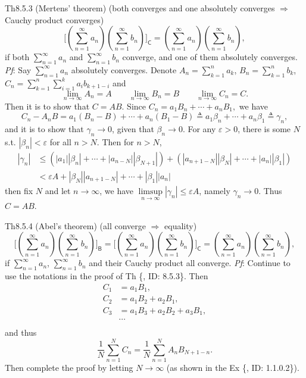 \documentclass{article}
\begin{document}
\begin{Th}{Th8.5.3 (Mertens' theorem) (both converges and one absolutely converges $\Rightarrow$ Cauchy product converges)}
    $$ \Bigg[\left(\sum_{n=1}^{\infty} a_n\right) \left(\sum_{n=1}^{\infty} b_n\right)\Bigg]_\mathsf{C} = \left(\sum_{n=1}^{\infty} a_n\right) \left(\sum_{n=1}^{\infty} b_n\right), $$
    if both $\sum_{n=1}^{\infty} a_n$ and $\sum_{n=1}^{\infty} b_n$ converge, and one of them absolutely converges.
    \tcblower
    \textit{Pf}: Say $\sum_{n=1}^{\infty} a_n$ absolutely converges. Denote $A_n = \sum_{k=1}^{n} a_k$, $B_n = \sum_{k=1}^{n} b_k$, $C_n = \sum_{k=1}^{n} \sum_{i=1}^{k}a_i b_{k+1-i}$ and $$\lim\limits_{n\to \infty} A_n = A \qquad \lim\limits_{n\to \infty} B_n = B \qquad \lim\limits_{n\to\infty} C_n = C.$$ Then it is to show that $C = AB$. Since $ C_n = a_1 B_n + \cdots + a_n B_1, $ we have
    $$ C_n - A_n B = a_1(B_n - B) + \cdots + a_n(B_1 - B) \triangleq a_1 \beta_n + \cdots + a_n \beta_1 \triangleq \gamma_n, $$
    and it is to show that $\gamma_n \rightarrow 0$, given that $\beta_n \rightarrow 0$. For any $\varepsilon>0$, there is some $N$ s.t. $|\beta_n| < \varepsilon$ for all $n>N$. Then for $n>N$,
    $$ 
    \begin{aligned}
        |\gamma_n| & \leq \left(|a_1| |\beta_n| + \cdots + |a_{n-N}| |\beta_{N+1}|\right) + \left(|a_{n+1-N}| |\beta_{N}| + \cdots + |a_n| |\beta_1|\right) \\
        & < \varepsilon A + |\beta_N| |a_{n+1-N}| + \cdots + |\beta_1| |a_n| 
    \end{aligned}
    $$
    then fix $N$ and let $n\rightarrow \infty$, we have $\limsup\limits_{n\to\infty} |\gamma_n| \leq \varepsilon A$, namely $\gamma_n \rightarrow 0$. Thus $C = AB$.
\end{Th}

\begin{Th}{Th8.5.4 (Abel's theorem) (all converge $\Rightarrow$ equality)}
    $$ \Bigg[\left(\sum_{n=1}^{\infty} a_n\right) \left(\sum_{n=1}^{\infty} b_n\right)\Bigg]_\mathsf{B} = \Bigg[\left(\sum_{n=1}^{\infty} a_n\right) \left(\sum_{n=1}^{\infty} b_n\right)\Bigg]_\mathsf{C} = \left(\sum_{n=1}^{\infty} a_n\right) \left(\sum_{n=1}^{\infty} b_n\right), $$
    if $\sum_{n=1}^{\infty} a_n$, $\sum_{n=1}^{\infty} b_n$ and their Cauchy product all converge.
    \tcblower
    \textit{Pf}: Continue to use the notations in the proof of Th \{, ID: 8.5.3\}. Then
    $$ 
    \begin{aligned}
        C_1 &= a_1 B_1, \\
        C_2 &= a_1 B_2 + a_2 B_1, \\
        C_3 &= a_1 B_3 + a_2 B_2 + a_3 B_1, \\
        & \cdots \\
    \end{aligned}
    $$
    and thus 
    $$ \frac{1}{N} \sum_{n=1}^{N} C_n = \frac{1}{N} \sum_{n=1}^{N} A_n B_{N+1-n}. $$
    Then complete the proof by letting $N\rightarrow \infty$ (as shown in the Ex \{, ID: 1.1.0.2\}).
\end{Th}
\end{document}

